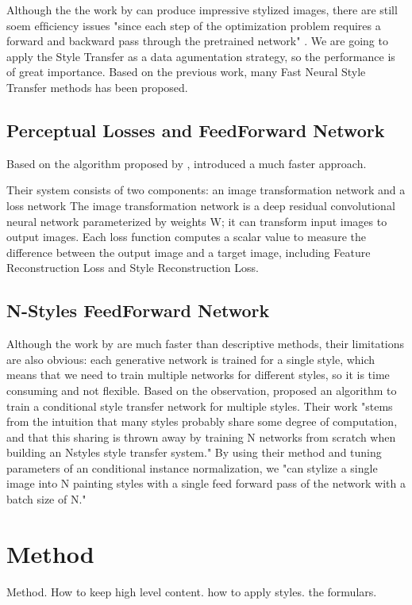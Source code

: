 \documentclass[a4paper,11pt]{article}
\begin{document}
Although the the work by \cite{gatys2016image} can produce impressive stylized images, there are still soem efﬁciency issues "since each step of the optimization problem requires a forward and backward pass through the pretrained network" \cite{johnson2016perceptual}. We are going to apply the Style Transfer as a data agumentation strategy, so the performance is of great importance. Based on the previous work, many Fast Neural Style Transfer methods has been proposed.
\subsection{Perceptual Losses and FeedForward Network}
Based on the algorithm proposed by \cite{gatys2016image}, \cite{johnson2016perceptual} introduced a much faster approach.
\begin{outline}
\1 Their system consists of two components: an image transformation network and a loss network
  \2 The image transformation network is a deep residual convolutional neural network parameterized by weights W; it can transform input images to output images.
  \2 Each loss function computes a scalar value to measure the diﬀerence between the output image and a target image, including Feature Reconstruction Loss and Style Reconstruction Loss.
\end{outline}
\subsection{N-Styles FeedForward Network}
Although the work by \cite{johnson2016perceptual} are much faster than descriptive methods, their limitations are also obvious: each generative network is trained for a single style, which means that we need to train multiple networks for different styles, so it is time consuming and not flexible. Based on the observation, \cite{dumoulin2016learned} proposed an algorithm to train a conditional style transfer network for multiple styles. Their work "stems from the intuition that many styles probably share some degree of computation, and that this sharing is thrown away by training N networks from scratch when building an Nstyles style transfer system."
By using their method and tuning parameters of an conditional instance normalization, we "can stylize a single image into N painting styles with a single feed forward pass of the network with a batch size of N." 

\section{Method}
Method. How to keep high level content. how to apply styles. the formulars.
\end{document}

